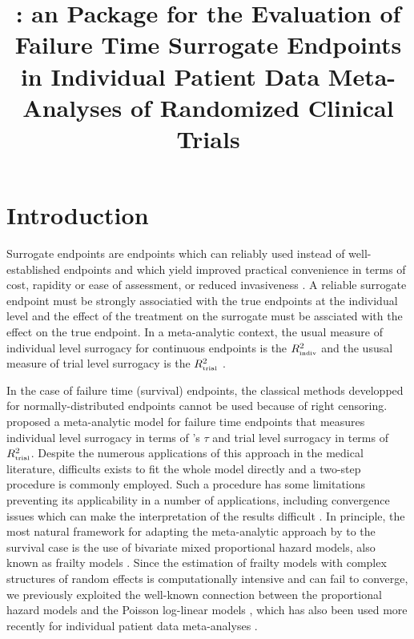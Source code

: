 \documentclass[article,shortnames, nojss]{jss}\usepackage[]{graphicx}\usepackage[]{color}
\author{
}
\title{\pkg{surrosurv}: an \proglang{R} Package for the Evaluation of Failure Time Surrogate Endpoints in Individual Patient Data Meta-Analyses of Randomized Clinical Trials}
\begin{document}

\section{Introduction}

Surrogate endpoints are endpoints which can reliably used
  instead of well-established endpoints
  and which yield improved practical convenience
  in terms of cost, rapidity or ease of assessment, 
  or reduced invasiveness \citep{Burzykowski2006}.
A reliable surrogate endpoint must be strongly associatied with
  the true endpoints at the individual level and
  the effect of the treatment on the surrogate
  must be assciated with the effect on the true endpoint.
In a meta-analytic context,
  the usual measure of individual level surrogacy for continuous endpoints is
  the $R^2_\text{\tiny indiv}$ 
  and the ususal measure of trial level surrogacy
  is the  $R^2_\text{\tiny trial}$ \citep{BuyseEtal00}.

In the case of failure time (survival) endpoints,
  the classical methods developped for normally-distributed endpoints
  cannot be used because of right censoring.
\cite{BurzykowskiEtal01} proposed a meta-analytic model
  for failure time endpoints that measures
  individual level surrogacy in terms of \cite{Kendall38}'s $\tau$
  and trial level surrogacy in terms of $R^2_\text{\tiny trial}$.
Despite the numerous applications of this approach in the medical literature,
  difficults exists to fit the whole model directly and
  a two-step procedure is commonly employed.
Such a procedure has some limitations 
  preventing its applicability in a number of applications,
  including convergence issues which can make the interpretation of the results difficult
  \citep{Oba2013, BurzykowskiCortinas05}.
In principle, the most natural framework for adapting the meta-analytic approach
  by \cite{BuyseEtal00} to the survival case
  is the use of bivariate mixed proportional hazard models,
  also known as frailty models \citep{DuchateauJanssen08}.
Since the estimation of frailty models with complex structures
  of random effects is computationally intensive and can fail to converge,
  we previously exploited \citep{RotoloPoissurogate}
  the well-known connection between the proportional hazard models
  and the Poisson log-linear models  \citep{Whitehead80, LairdOlivier81},
  which has also been used more recently for individual patient data meta-analyses
  \citep{crowtherEtal12}.
\end{document}
